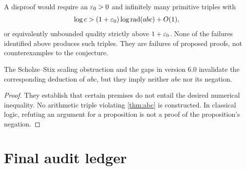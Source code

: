 
A disproof would require an $\varepsilon_0>0$ and infinitely many primitive triples with
\[
 \log c>(1+\varepsilon_0)\log\operatorname{rad}(abc)+O(1),
\]
or equivalently unbounded quality strictly above $1+\varepsilon_0$.  None of the failures identified above produces such triples.  They are failures of proposed proofs, not counterexamples to the conjecture.

\begin{proposition}
The Scholze--Stix scaling obstruction and the gaps in version 6.0 invalidate the corresponding deduction of $abc$, but they imply neither $abc$ nor its negation.
\end{proposition}

\begin{proof}
They establish that certain premises do not entail the desired numerical inequality.  No arithmetic triple violating \cref{thm:abc} is constructed.  In classical logic, refuting an argument for a proposition is not a proof of the proposition's negation.
\end{proof}

\section{Final audit ledger}

